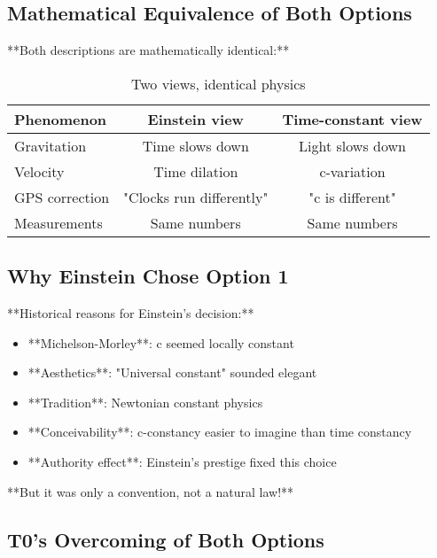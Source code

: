 \documentclass[12pt,a4paper]{article}
\begin{document}
{{{{{						\subsection{Mathematical Equivalence of Both Options}
						
						**Both descriptions are mathematically identical:**
						
						\begin{table}[htbp]
							\centering
							\begin{tabular}{|l|c|c|}
								\hline
								\textbf{Phenomenon} & \textbf{Einstein view} & \textbf{Time-constant view} \\
								\hline
								Gravitation & Time slows down & Light slows down \\
								Velocity & Time dilation & c-variation \\
								GPS correction & "Clocks run differently" & "c is different" \\
								Measurements & Same numbers & Same numbers \\
								\hline
							\end{tabular}
							\caption{Two views, identical physics}
						\end{table}
						
						\subsection{Why Einstein Chose Option 1}
						
						**Historical reasons for Einstein's decision:**
						\begin{itemize}
							\item **Michelson-Morley**: c seemed locally constant
							\item **Aesthetics**: "Universal constant" sounded elegant
							\item **Tradition**: Newtonian constant physics
							\item **Conceivability**: c-constancy easier to imagine than time constancy
							\item **Authority effect**: Einstein's prestige fixed this choice
						\end{itemize}
						
						**But it was only a convention, not a natural law!**
						
						\subsection{T0's Overcoming of Both Options}
						
}}}}}
\end{document}
